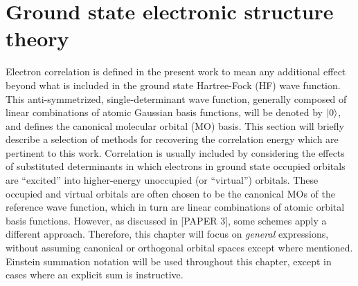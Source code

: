 \section{Ground state electronic structure theory} \label{se:est}
Electron correlation is defined in the present work to mean any additional effect beyond what is
included in the ground state Hartree-Fock (HF) wave function. This anti-symmetrized, 
single-determinant wave function, generally composed of linear combinations of atomic Gaussian basis functions, will be denoted by $| 0 \rangle$, and defines the canonical molecular orbital (MO) basis. 
This section will briefly describe a selection of methods for recovering the correlation energy which are
pertinent to this work.
Correlation is usually included by considering the effects of substituted determinants in which electrons
in ground state occupied orbitals are ``excited'' into higher-energy unoccupied (or ``virtual'') orbitals. 
These occupied and virtual orbitals are often chosen to be the canonical MOs of the reference 
wave function, which in turn are linear combinations of atomic orbital basis functions.
However, as discussed in [PAPER 3], some schemes apply a different approach. Therefore, this 
chapter will focus on \textit{general} expressions, without assuming canonical or orthogonal orbital
spaces except where mentioned.   
Einstein summation notation will be used throughout this chapter, except in cases where an explicit sum
is instructive.

